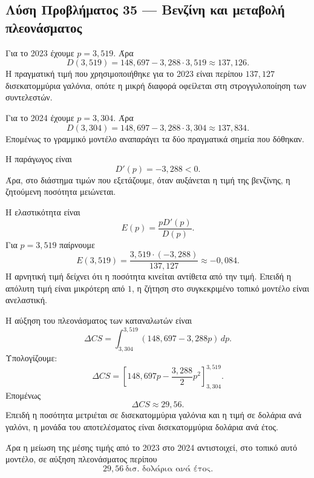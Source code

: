 \subsection*{Λύση Προβλήματος 35 --- Βενζίνη και μεταβολή πλεονάσματος}

\begin{alist}
  \item Για το 2023 έχουμε $p=3{,}519$. Άρα
        \[
          D(3{,}519)
          =
          148{,}697-3{,}288\cdot3{,}519
          \approx137{,}126.
        \]
        Η πραγματική τιμή που χρησιμοποιήθηκε για το 2023 είναι περίπου
        $137{,}127$ δισεκατομμύρια γαλόνια, οπότε η μικρή διαφορά
        οφείλεται στη στρογγυλοποίηση των συντελεστών.

        Για το 2024 έχουμε $p=3{,}304$. Άρα
        \[
          D(3{,}304)
          =
          148{,}697-3{,}288\cdot3{,}304
          \approx137{,}834.
        \]
        Επομένως το γραμμικό μοντέλο αναπαράγει τα δύο πραγματικά
        σημεία που δόθηκαν.

  \item Η παράγωγος είναι
        \[
          D'(p)=-3{,}288<0.
        \]
        Άρα, στο διάστημα τιμών που εξετάζουμε, όταν αυξάνεται η τιμή
        της βενζίνης, η ζητούμενη ποσότητα μειώνεται.

        Η ελαστικότητα είναι
        \[
          E(p)=\frac{pD'(p)}{D(p)}.
        \]
        Για $p=3{,}519$ παίρνουμε
        \[
          E(3{,}519)
          =
          \frac{3{,}519\cdot(-3{,}288)}{137{,}127}
          \approx -0{,}084.
        \]
        Η αρνητική τιμή δείχνει ότι η ποσότητα κινείται αντίθετα από
        την τιμή. Επειδή η απόλυτη τιμή είναι μικρότερη από $1$, η
        ζήτηση στο συγκεκριμένο τοπικό μοντέλο είναι ανελαστική.

  \item Η αύξηση του πλεονάσματος των καταναλωτών είναι
        \[
          \Delta CS
          =
          \int_{3{,}304}^{3{,}519}
          \left(148{,}697-3{,}288p\right)\,dp.
        \]
        Υπολογίζουμε:
        \[
          \Delta CS
          =
          \left[
            148{,}697p-\frac{3{,}288}{2}p^2
          \right]_{3{,}304}^{3{,}519}.
        \]
        Επομένως
        \[
          \Delta CS\approx29{,}56.
        \]
        Επειδή η ποσότητα μετριέται σε δισεκατομμύρια γαλόνια και η
        τιμή σε δολάρια ανά γαλόνι, η μονάδα του αποτελέσματος είναι
        δισεκατομμύρια δολάρια ανά έτος.

        Άρα η μείωση της μέσης τιμής από το 2023 στο 2024 αντιστοιχεί,
        στο τοπικό αυτό μοντέλο, σε αύξηση πλεονάσματος περίπου
        \[
          {29{,}56\ \text{δισ. δολάρια ανά έτος}}.
        \]
\end{alist}
